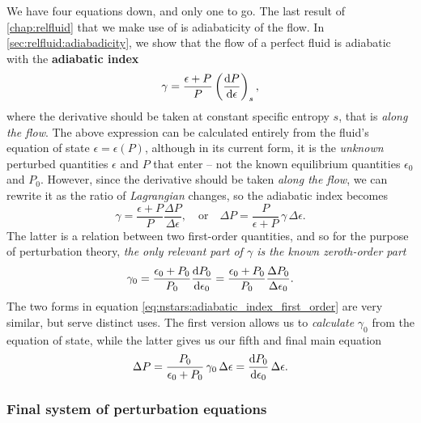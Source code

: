 We have four equations down, and only one to go.
The last result of \cref{chap:relfluid} that we make use of is adiabaticity of the flow.
In \cref{sec:relfluid:adiabadicity}, we show that the flow of a perfect fluid is adiabatic with the \textbf{adiabatic index}
\begin{equation}
	\gamma = \frac{\epsilon+P}{P} \left( \odv{P}{\epsilon} \right)_s,
\label{eq:nstars:adiabatic_index0}
\end{equation}
where the derivative should be taken at constant specific entropy $s$, that is \emph{along the flow}.
The above expression can be calculated entirely from the fluid's equation of state $\epsilon = \epsilon(P)$, although in its current form, it is the \emph{unknown} perturbed quantities $\epsilon$ and $P$ that enter -- not the known equilibrium quantities $\epsilon_0$ and $P_0$.
However, since the derivative should be taken \emph{along the flow}, we can rewrite it as the ratio of \emph{Lagrangian} changes, so the adiabatic index becomes
\begin{equation}
	\gamma = 
	\frac{\epsilon+P}{P} \frac{\Delta P}{\Delta \epsilon} ,
	\quad \text{or} \quad
	\Delta P = \frac{P}{\epsilon + P} \, \gamma \, \Delta \epsilon .
\label{eq:nstars:adiabatic_index}
\end{equation}
The latter is a relation between two first-order quantities, and so for the purpose of perturbation theory, \emph{the only relevant part of $\gamma$ is the known zeroth-order part}
\begin{equation}
	\gamma_0 = \frac{\epsilon_0+P_0}{P_0} \odv{P_0}{\epsilon_0}
	         = \frac{\epsilon_0+P_0}{P_0} \frac{\Delta P_0}{\Delta \epsilon_0} .
\label{eq:nstars:adiabatic_index_first_order}
\end{equation}
The two forms in equation \eqref{eq:nstars:adiabatic_index_first_order} are very similar, but serve distinct uses.
The first version allows us to \emph{calculate} $\gamma_0$ from the equation of state, while the latter gives us our fifth and final main equation
\begin{equation}
	\Delta P = \frac{P_0}{\epsilon_0 + P_0} \, \gamma_0 \, \Delta \epsilon
	         = \odv{P_0}{\epsilon_0} \, \Delta\epsilon .
\label{eq:nstars:Delta_P}
\end{equation}

\subsubsection{Final system of perturbation equations}

